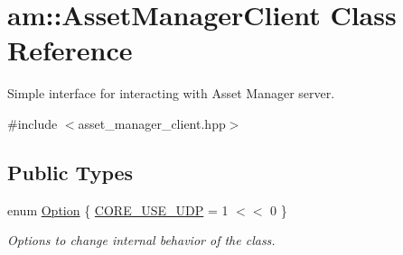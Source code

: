 \hypertarget{classam_1_1_asset_manager_client}{
\section{am::AssetManagerClient Class Reference}
\label{classam_1_1_asset_manager_client}
}


Simple interface for interacting with Asset Manager server.  




{\ttfamily \#include $<$asset\_\-manager\_\-client.hpp$>$}

\subsection*{Public Types}
\begin{DoxyCompactItemize}
\item 
enum \hyperlink{classam_1_1_asset_manager_client_a46c830784e6b2983faa4764d1cad8204}{Option} \{ \hyperlink{classam_1_1_asset_manager_client_a46c830784e6b2983faa4764d1cad8204afbddc98293c73fb9327140202446bcd3}{CORE\_\-USE\_\-UDP} =  1 $<$$<$ 0
 \}
\begin{DoxyCompactList}\small\item\em Options to change internal behavior of the class. \end{DoxyCompactList}\end{DoxyCompactItemize}
